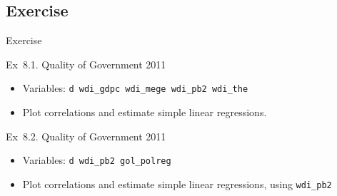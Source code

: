 \documentclass[t]{beamer}
\begin{document}
  \subsection{Exercise}
  
  \begin{frame}{Exercise}

		\begin{exampleblock}{Ex~8.1. Quality of Government 2011}

			\begin{itemize}
				\item Variables: \texttt{d wdi\_gdpc wdi\_mege wdi\_pb2 wdi\_the}
				\item Plot correlations and estimate simple linear regressions.
			\end{itemize}

		\end{exampleblock}


    \begin{exampleblock}{Ex~8.2. Quality of Government 2011}
			
			\begin{itemize}
				\item Variables: \texttt{d wdi\_pb2 gol\_polreg }
				\item Plot correlations and estimate simple linear regressions, using \texttt{wdi\_pb2}
			\end{itemize}
			
    \end{exampleblock}


  \end{frame}
	
\end{document}
